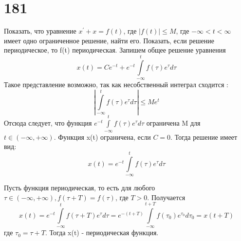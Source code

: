 \documentclass[a4paper,12pt]{article}
\begin{document}
\section{181}
Показать, что уравнение $ x^{'} + x = f(t)$, где $|f(t)| \le M$, где $ -\infty < t < \infty $ имеет одно ограниченное решение, найти его. 
Показать, если решение периодическое, то f(t) периодическая.\newline
Запишем общее решение уравнения
\[x(t) = Ce^{-t} + e^{-t}\int\limits_{-\infty}^tf(\tau)e^{\tau}d\tau\]
Такое представление возможно, так как несобственный интеграл сходится :
\[|\int\limits_{-\infty}^tf(\tau)e^{\tau}d\tau| \le Me^t\]
Отсюда следует, что функция $e^{-t}\int\limits_{-\infty}^tf(\tau)e^{\tau}d\tau$ ограничена M для $t \in (-\infty, +\infty)$.
Функция x(t) ограничена, если $C=0$. Тогда решение имеет вид:
\[x(t) = e^{-t}\int\limits_{-\infty}^tf(\tau)e^{\tau}d\tau\]

Пусть функция периодическая, то есть для любого $\tau\in(-\infty, +\infty), f(\tau + T) = f(\tau)$, где $T > 0$. Получается
\[x(t) = e^{-t}\int\limits_{-\infty}^tf(\tau + T)e^{\tau}d\tau = e^{-(t + T)}\int\limits_{-\infty}^{t + T}f(\tau_0)e^{\tau_0}d\tau_0 = x(t + T)\]
где $\tau_0 = \tau + T$. Тогда x(t) - периодическая функция.
\end{document}
